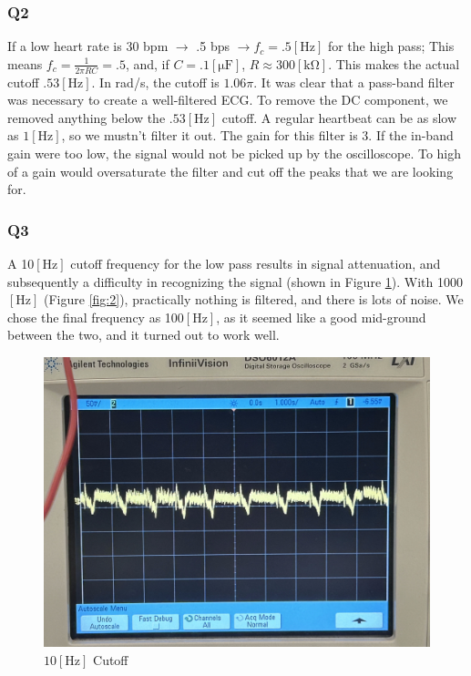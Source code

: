 \documentclass[
	letterpaper, %
	10pt, %
]{CSUniSchoolLabReport}
\begin{document}
\subsubsection{Q2} If a low heart rate is 30 bpm $\rightarrow$ .5 bps $\rightarrow f_c=.5[\si{\hertz}]$ for the high pass; This means $f_c=\frac{1}{2\pi RC}=.5$, and, if $C=.1[\si{\micro\farad}]$, $R\approx300[\si{\kilo\ohm}]$. This makes the actual cutoff $.53[\si{\hertz}]$. In rad/s, the cutoff is $1.06\pi$. It was clear that a pass-band filter was necessary to create a well-filtered ECG. To remove the DC component, we removed anything below the $.53[\si{\hertz}]$ cutoff. A regular heartbeat can be as slow as $1[\si{\hertz}]$, so we mustn't filter it out. The gain for this filter is 3. If the in-band gain were too low, the signal would not be picked up by the oscilloscope. To high of a gain would oversaturate the filter and cut off the peaks that we are looking for.

\subsubsection{Q3} A 10$[\si{\hertz}]$ cutoff frequency for the low pass results in signal attenuation, and subsequently a difficulty in recognizing the signal (shown in Figure \ref{fig:1}). With 1000$[\si{\hertz}]$ (Figure \ref{fig:2}), practically nothing is filtered, and there is lots of noise. We chose the final frequency as 100$[\si{\hertz}]$, as it seemed like a good mid-ground between the two, and it turned out to work well.

\begin{figure}[H]
  \centering
  \includegraphics[width=.9\textwidth]{Figures/L15Q3.jpg}
  \caption{$10[\si{\hertz}]$ Cutoff}
  \label{fig:1}
\end{figure}
\end{document}
